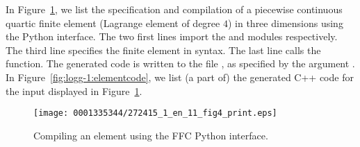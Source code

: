In Figure~\ref{fig:logg-1:python:element}, we list the specification and
compilation of a piecewise continuous quartic finite element (Lagrange
element of degree $4$) in three dimensions using the
\ffc{} Python interface. The two first lines import the \ufl{}
and \ffc{} modules respectively. The third line specifies the finite
element in \ufl{} syntax. The last line calls the \ffc{}
 function. The generated code is written to
the file , as specified by the argument . In
Figure~\ref{fig:logg-1:elementcode}, we list (a part of) the generated
C++ code for the input displayed in Figure~\ref{fig:logg-1:python:element}.

\begin{figure}[!p]
\bwfig
\narrowfigure
\texttt{[image: 0001335344/272415\_1\_en\_11\_fig4\_print.eps]}
\caption{Compiling an element using the FFC Python interface.}
\label{fig:logg-1:python:element}\vspace*{1pc}
\end{figure}

